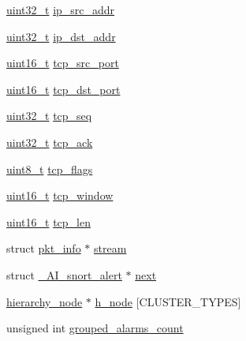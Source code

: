 \begin{DoxyCompactItemize}
\item 
\hyperlink{spp__ai_8h_a435d1572bf3f880d55459d9805097f62}{uint32\_\-t} \hyperlink{struct__AI__snort__alert_a194117c57a52933d16a97838562bb611}{ip\_\-src\_\-addr}
\item 
\hyperlink{spp__ai_8h_a435d1572bf3f880d55459d9805097f62}{uint32\_\-t} \hyperlink{struct__AI__snort__alert_a754ca683593c838e4032fa8c13b1512b}{ip\_\-dst\_\-addr}
\item 
\hyperlink{spp__ai_8h_a273cf69d639a59973b6019625df33e30}{uint16\_\-t} \hyperlink{struct__AI__snort__alert_a4d4cbdbd9675f4c43545547f55174cb7}{tcp\_\-src\_\-port}
\item 
\hyperlink{spp__ai_8h_a273cf69d639a59973b6019625df33e30}{uint16\_\-t} \hyperlink{struct__AI__snort__alert_aaca31cb67d48ffc3bfd1227686d5f5a4}{tcp\_\-dst\_\-port}
\item 
\hyperlink{spp__ai_8h_a435d1572bf3f880d55459d9805097f62}{uint32\_\-t} \hyperlink{struct__AI__snort__alert_ad6edf59fccea55bf5f940bf36117020b}{tcp\_\-seq}
\item 
\hyperlink{spp__ai_8h_a435d1572bf3f880d55459d9805097f62}{uint32\_\-t} \hyperlink{struct__AI__snort__alert_a8aac577224a4325ec50511c6d79b4b79}{tcp\_\-ack}
\item 
\hyperlink{spp__ai_8h_aba7bc1797add20fe3efdf37ced1182c5}{uint8\_\-t} \hyperlink{struct__AI__snort__alert_aa643f11db93b70242b57f0a04775e507}{tcp\_\-flags}
\item 
\hyperlink{spp__ai_8h_a273cf69d639a59973b6019625df33e30}{uint16\_\-t} \hyperlink{struct__AI__snort__alert_a1687fccc26bb211591db8b36ffec5348}{tcp\_\-window}
\item 
\hyperlink{spp__ai_8h_a273cf69d639a59973b6019625df33e30}{uint16\_\-t} \hyperlink{struct__AI__snort__alert_ab7e0507050b8e475fea7a4b26c768857}{tcp\_\-len}
\item 
struct \hyperlink{structpkt__info}{pkt\_\-info} $\ast$ \hyperlink{struct__AI__snort__alert_a09dfe0a841fd3912ec78060d4547cb31}{stream}
\item 
struct \hyperlink{struct__AI__snort__alert}{\_\-AI\_\-snort\_\-alert} $\ast$ \hyperlink{struct__AI__snort__alert_aa8336d4b3359015ed8ea312ca1fd1173}{next}
\item 
\hyperlink{struct__hierarchy__node}{hierarchy\_\-node} $\ast$ \hyperlink{struct__AI__snort__alert_ac53765584296ead1328eabfaba8a3aed}{h\_\-node} \mbox{[}CLUSTER\_\-TYPES\mbox{]}
\item 
unsigned int \hyperlink{struct__AI__snort__alert_a285aff12d6bac03c316ccc5305d28e53}{grouped\_\-alarms\_\-count}
\item 

\end{DoxyCompactItemize}
